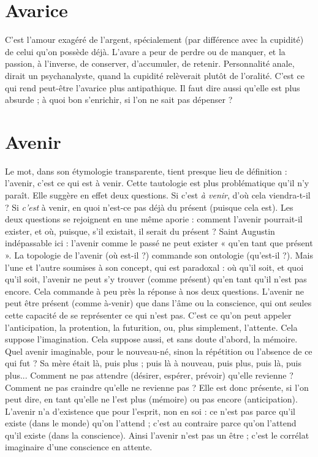 \section{Avarice}
C'est l’amour exagéré de l’argent, spécialement (par différence
avec la cupidité) de celui qu’on possède déjà. L’avare a peur de
perdre ou de manquer, et la passion, à l'inverse, de conserver, d’accumuler, de
retenir. Personnalité anale, dirait un psychanalyste, quand la cupidité relèverait
plutôt de l’oralité. C’est ce qui rend peut-être l’avarice plus antipathique. Il faut
dire aussi qu’elle est plus absurde ; à quoi bon s'enrichir, si l'on ne sait pas
dépenser ?

\section{Avenir}
Le mot, dans son étymologie transparente, tient presque lieu de
définition : l'avenir, c’est ce qui est à venir. Cette tautologie est
plus problématique qu’il n’y paraît. Elle suggère en effet deux questions. Si
c’est {\it à venir}, d'où cela viendra-t-il ? Si {\it c'est} à venir, en quoi n’est-ce pas déjà
du présent (puisque cela est). Les deux questions se rejoignent en une même
aporie : comment l’avenir pourrait-il exister, et où, puisque, s’il existait, il
serait du présent ? Saint Augustin indépassable ici : l'avenir comme le passé
ne peut exister « qu’en tant que présent ». La topologie de l’avenir (où est-il ?)
commande son ontologie (qu’est-il ?). Mais l’une et l’autre soumises à
son concept, qui est paradoxal : où qu’il soit, et quoi qu’il soit, l’avenir ne
peut s’y trouver (comme présent) qu’en tant qu’il n’est pas encore. Cela
commande à peu près la réponse à nos deux questions. L'avenir ne peut être
présent (comme à-venir) que dans l’âme ou la conscience, qui ont seules
cette capacité de se représenter ce qui n’est pas. C’est ce qu’on peut appeler
l’anticipation, la protention, la futurition, ou, plus simplement, l’attente.
Cela suppose l'imagination. Cela suppose aussi, et sans doute d’abord, la
mémoire. Quel avenir imaginable, pour le nouveau-né, sinon la répétition
ou l’absence de ce qui fut ? Sa mère était là, puis plus ; puis là à nouveau,
puis plus, puis là, puis plus... Comment ne pas attendre (désirer, espérer,
prévoir) qu’elle revienne ? Comment ne pas craindre qu’elle ne revienne
pas ? Elle est donc présente, si l’on peut dire, en tant qu’elle ne l’est plus
(mémoire) ou pas encore (anticipation). L’avenir n’a d’existence que pour
l'esprit, non en soi : ce n’est pas parce qu’il existe (dans le monde) qu’on
l'attend ; c’est au contraire parce qu’on l’attend qu’il existe (dans la conscience).
Ainsi l’avenir n’est pas un être ; c’est le corrélat imaginaire d’une
conscience en attente.

